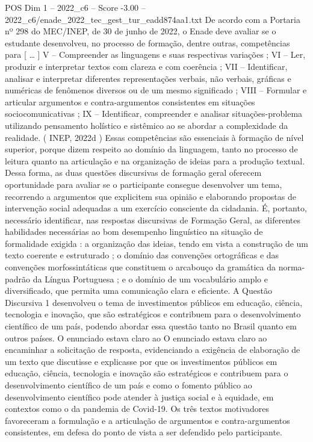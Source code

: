 \begin{textsample}{POS Dim 1 – 2022\_c6 – Score -3.00 – 2022\_c6/enade\_2022\_tec\_gest\_tur\_eadd874aa1.txt}
De acordo com a Portaria nº 298 do MEC/INEP, de 30 de junho de 2022, o Enade deve avaliar se o estudante desenvolveu, no processo de formação, dentre outras, competências para [ … ] V – Compreender as linguagens e suas respectivas variações ; VI – Ler, produzir e interpretar textos com clareza e com coerência ; VII – Identificar, analisar e interpretar diferentes representações verbais, não verbais, gráficas e numéricas de fenômenos diversos ou de um mesmo significado ; VIII – Formular e articular argumentos e contra-argumentos consistentes em situações sociocomunicativas ; IX – Identificar, compreender e analisar situações-problema utilizando pensamento holístico e sistêmico ao se abordar a complexidade da realidade. ( INEP, 2022d ) Essas competências são essenciais à formação de nível superior, porque dizem respeito ao domínio da linguagem, tanto no processo de leitura quanto na articulação e na organização de ideias para a produção textual.
Dessa forma, as duas questões discursivas de formação geral oferecem oportunidade para avaliar se o participante consegue desenvolver um tema, recorrendo a argumentos que explicitem sua opinião e elaborando propostas de intervenção social adequadas a um exercício consciente da cidadania.
É, portanto, necessário identificar, nas respostas discursivas de Formação Geral, as diferentes habilidades necessárias ao bom desempenho linguístico na situação de formalidade exigida : a organização das ideias, tendo em vista a construção de um texto coerente e estruturado ; o domínio das convenções ortográficas e das convenções morfossintáticas que constituem o arcabouço da gramática da norma-padrão da Língua Portuguesa ; e o domínio de um vocabulário amplo e diversificado, que permita uma comunicação clara e eficiente.
A Questão Discursiva 1 desenvolveu o tema de investimentos públicos em educação, ciência, tecnologia e inovação, que são estratégicos e contribuem para o desenvolvimento científico de um país, podendo abordar essa questão tanto no Brasil quanto em outros países.
O enunciado estava claro ao O enunciado estava claro ao encaminhar a solicitação de resposta, evidenciando a exigência de elaboração de um texto que discutisse e explicasse por que os investimentos públicos em educação, ciência, tecnologia e inovação são estratégicos e contribuem para o desenvolvimento científico de um país e como o fomento público ao desenvolvimento científico pode atender à justiça social e à equidade, em contextos como o da pandemia de Covid-19.
Os três textos motivadores favoreceram a formulação e a articulação de argumentos e contra-argumentos consistentes, em defesa do ponto de vista a ser defendido pelo participante.

\end{textsample}
